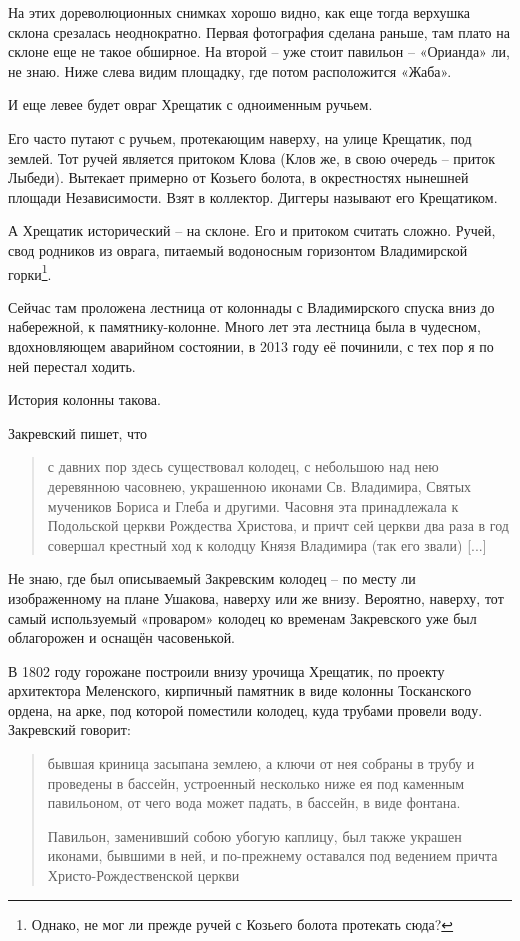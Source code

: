На этих дореволюционных снимках хорошо видно, как еще тогда верхушка склона срезалась неоднократно. Первая фотография сделана раньше, там плато на склоне еще не такое обширное. На второй – уже стоит павильон – «Орианда» ли, не знаю. Ниже слева видим площадку, где потом расположится «Жаба».

И еще левее будет овраг Хрещатик с одноименным ручьем. 

Его часто путают с ручьем, протекающим наверху, на улице Крещатик, под землей. Тот ручей является притоком Клова (Клов же, в свою очередь – приток Лыбеди). Вытекает примерно от Козьего болота, в окрестностях нынешней площади Независимости. Взят в коллектор. Диггеры называют его Крещатиком.

А Хрещатик исторический – на склоне. Его и притоком считать сложно. Ручей, свод родников из оврага, питаемый водоносным горизонтом Владимирской горки\footnote{Однако, не мог ли прежде ручей с Козьего болота протекать сюда?}.

Сейчас там проложена лестница от колоннады с Владимирского спуска вниз до набережной, к памятнику-колонне. Много лет эта лестница была в чудесном, вдохновляющем аварийном состоянии, в 2013 году её починили, с тех пор я по ней перестал ходить.

История колонны такова.

Закревский пишет, что

\begin{quotation}
с давних пор здесь существовал колодец, с небольшою над нею деревянною часовнею, украшенною иконами Св. Владимира, Святых мучеников Бориса и Глеба и другими. Часовня эта принадлежала к Подольской церкви Рождества Христова, и причт сей церкви два раза в год совершал крестный ход к колодцу Князя Владимира (так его звали) [...]
\end{quotation}

Не знаю, где был описываемый Закревским колодец – по месту ли изображенному на плане Ушакова, наверху или же внизу. Вероятно, наверху, тот самый используемый «проваром» колодец ко временам Закревского уже был облагорожен и оснащён часовенькой.

В 1802 году горожане построили внизу урочища Хрещатик, по проекту архитектора Меленского, кирпичный памятник в виде колонны Тосканского ордена, на арке, под которой поместили колодец, куда трубами провели воду. Закревский говорит:

\begin{quotation}
бывшая криница засыпана землею, а ключи от нея собраны в трубу и проведены в бассейн, устроенный несколько ниже ея под каменным павильоном, от чего вода может падать, в бассейн, в виде фонтана.

Павильон, заменивший собою убогую каплицу, был также украшен иконами, бывшими в ней, и по-прежнему оставался под ведением причта Христо-Рождественской церкви
\end{quotation}

